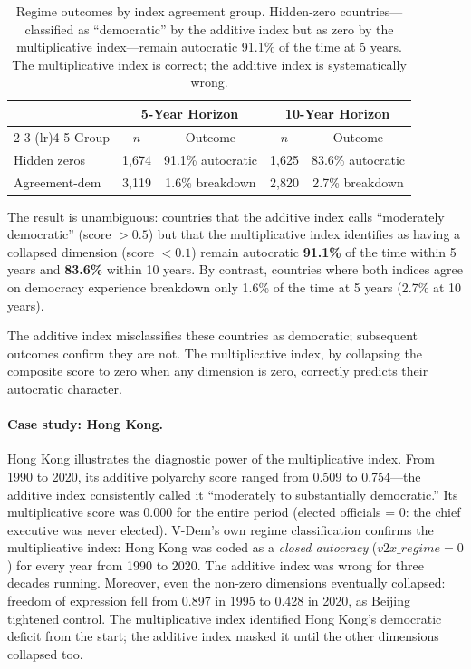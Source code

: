 \documentclass[12pt]{article}
\begin{document}
\begin{table}[h]
\centering
\begin{tabular}{@{}lcccc@{}}
\toprule
& \multicolumn{2}{c}{5-Year Horizon} & \multicolumn{2}{c}{10-Year Horizon} \\
\cmidrule(lr){2-3} \cmidrule(lr){4-5}
Group & $n$ & Outcome & $n$ & Outcome \\
\midrule
Hidden zeros & 1,674 & 91.1\% autocratic & 1,625 & 83.6\% autocratic \\
Agreement-dem & 3,119 & 1.6\% breakdown & 2,820 & 2.7\% breakdown \\
\bottomrule
\end{tabular}
\caption{Regime outcomes by index agreement group. Hidden-zero countries---classified as ``democratic'' by the additive index but as zero by the multiplicative index---remain autocratic 91.1\% of the time at 5 years. The multiplicative index is correct; the additive index is systematically wrong.}
\label{tab:vdem_outcomes}
\end{table}

The result is unambiguous: countries that the additive index calls ``moderately democratic'' (score $> 0.5$) but that the multiplicative index identifies as having a collapsed dimension (score $< 0.1$) remain autocratic \textbf{91.1\%} of the time within 5 years and \textbf{83.6\%} within 10 years. By contrast, countries where both indices agree on democracy experience breakdown only 1.6\% of the time at 5 years (2.7\% at 10 years).

The additive index misclassifies these countries as democratic; subsequent outcomes confirm they are not. The multiplicative index, by collapsing the composite score to zero when any dimension is zero, correctly predicts their autocratic character.

\paragraph{Case study: Hong Kong.} Hong Kong illustrates the diagnostic power of the multiplicative index. From 1990 to 2020, its additive polyarchy score ranged from 0.509 to 0.754---the additive index consistently called it ``moderately to substantially democratic.'' Its multiplicative score was 0.000 for the entire period (elected officials = 0: the chief executive was never elected). V-Dem's own regime classification confirms the multiplicative index: Hong Kong was coded as a \emph{closed autocracy} ($v2x\_regime = 0$) for every year from 1990 to 2020. The additive index was wrong for three decades running. Moreover, even the non-zero dimensions eventually collapsed: freedom of expression fell from 0.897 in 1995 to 0.428 in 2020, as Beijing tightened control. The multiplicative index identified Hong Kong's democratic deficit from the start; the additive index masked it until the other dimensions collapsed too.
\end{document}
